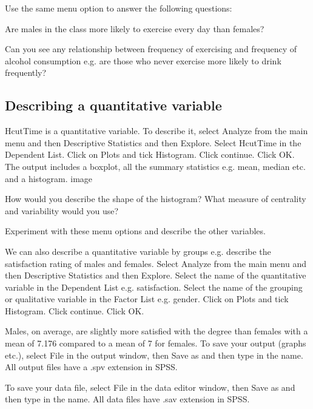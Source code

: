 Use the same menu option to answer the following questions:
 
Are males in the class more likely to exercise every day than females?
 
 
 
Can you see any relationship between frequency of exercising and frequency of alcohol consumption e.g. are those who never exercise more likely to drink frequently?
 
\subsection{Describing a quantitative variable}
 
HcutTime is a quantitative variable. To describe it, select Analyze from the main menu and then Descriptive Statistics and then Explore. 
Select HcutTime in the Dependent List. Click on Plots and tick Histogram. Click continue. Click OK. 
The output includes a boxplot, all the summary statistics e.g. mean, median etc. and a histogram.
image
 
 
 
 
How would you describe the shape of the histogram? What measure of centrality and variability would you use?
 
 
 
Experiment with these menu options and describe the other variables.
 
 
We can also describe a quantitative variable by groups e.g. describe the satisfaction rating of males and females. 
Select Analyze from the main menu and then Descriptive Statistics and then Explore. Select the name of the quantitative variable in the Dependent List e.g. satisfaction. 
Select the name of the grouping or qualitative variable in the Factor List e.g. gender. Click on Plots and tick Histogram. Click continue. Click OK.
 
Males, on average, are slightly more satisfied with the degree than females with a mean of 7.176 compared to a mean of 7 for females.
To save your output (graphs etc.), select File in the output window, then Save as and then type in the name. All output files have a .spv extension in SPSS.
 
To save your data file, select File in the data editor window, then Save as and then type in the name. All data files have .sav extension in SPSS.
 
\newpage 
 
